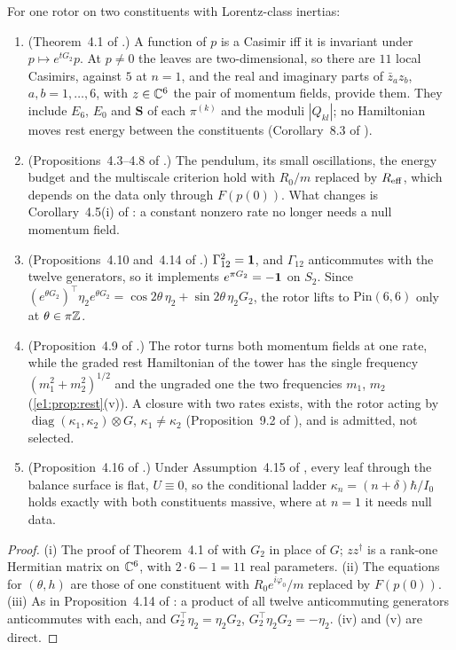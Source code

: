 \begin{proposition}
\label{e5:prop:carry}
For one rotor on two constituents with Lorentz-class inertias:
\begin{enumerate}[label=(\roman*),leftmargin=2.2em]
\item (Theorem~4.1 of \cite{RE}.) A function of $p$ is a Casimir iff it is invariant under $p\mapsto e^{tG_2}p$. At $p\neq0$ the leaves are
two-dimensional, so there are $11$ local Casimirs, against $5$ at $n=1$, and the real and imaginary parts of $\bar z_az_b$, $a,b=1,\dots,6$, with $z\in\mathbb{C}^6$ the pair of
momentum fields, provide them. They include $E_6$, $E_0$ and $\mathbf S$ of each $\pi^{(k)}$ and the moduli $|Q_{kl}|$; no Hamiltonian moves rest energy
between the constituents (Corollary~8.3 of \cite{RE}).
\item (Propositions~4.3--4.8 of \cite{RE}.) The pendulum, its small oscillations, the energy budget and the multiscale criterion hold with $R_0/m$ replaced
by $R_{\rm eff}$, which depends on the data only through $F(p(0))$. What changes is Corollary~4.5(i) of \cite{RE}: a constant nonzero rate no longer
needs a null momentum field.
\item (Propositions~4.10 and~4.14 of \cite{RE}.) $\Gamma_{12}^2=\mathbf 1$, and $\Gamma_{12}$ anticommutes with the twelve generators, so it implements
$e^{\pi G_2}=-\mathbf 1$ on $S_2$. Since $(e^{\theta G_2})^{\!\top}\eta_2e^{\theta G_2}=\cos2\theta\,\eta_2+\sin2\theta\,\eta_2G_2$, the rotor lifts to
$\mathrm{Pin}(6,6)$ only at $\theta\in\pi\mathbb{Z}$.
\item (Proposition~4.9 of \cite{RE}.) The rotor turns both momentum fields at one rate, while the graded rest Hamiltonian of the tower has the single
frequency $(m_1^2+m_2^2)^{1/2}$ and the ungraded one the two frequencies $m_1$, $m_2$ (\cref{e1:prop:rest}(v)). A closure with two rates exists, with
the rotor acting by $\operatorname{diag}(\kappa_1,\kappa_2)\otimes G$, $\kappa_1\neq\kappa_2$ (Proposition~9.2 of \cite{RE}), and is admitted, not selected.
\item (Proposition~4.16 of \cite{RE}.) Under Assumption~4.15 of \cite{RE}, every leaf through the balance surface is flat, $U\equiv0$, so the
conditional ladder $\kappa_n=(n+\delta)\hbar/I_0$ holds exactly with both constituents massive, where at $n=1$ it needs null data.
\end{enumerate}
\end{proposition}

\begin{proof}
(i) The proof of Theorem~4.1 of \cite{RE} with $G_2$ in place of $G$; $zz^\dagger$ is a rank-one Hermitian matrix on $\mathbb{C}^6$, with $2\cdot6-1=11$ real
parameters. (ii) The equations for $(\theta,h)$ are those of one constituent with $R_0e^{i\varphi_0}/m$ replaced by $F(p(0))$. (iii) As in Proposition~4.14 of
\cite{RE}: a product of all twelve anticommuting generators anticommutes with each, and $G_2^{\!\top}\eta_2=\eta_2G_2$, $G_2^{\!\top}\eta_2G_2=-\eta_2$.
(iv) and (v) are direct.
\end{proof}

